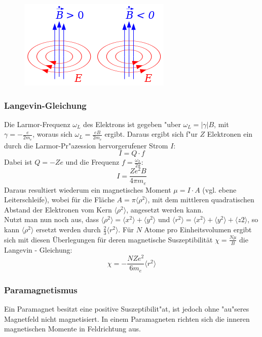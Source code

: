             \begin{figure}[H]
                \centering
                \includegraphics{Images/lenzRegel.png}
                \label{figLenz}
            \end{figure}
        \subsubsection*{Langevin-Gleichung}
        Die Larmor-Frequenz $\omega_L$ des Elektrons ist gegeben "uber $\omega_L = |\gamma | B$, mit $\gamma = -\frac{e}{2m_e}$, woraus sich $\omega_L = \frac{eB}{2m_e}$ ergibt. Daraus ergibt sich f"ur $Z$ Elektronen ein durch die Larmor-Pr"azession hervorgerufener Strom $I$:
        \begin{equation}
        	I = Q \cdot f
        \end{equation}
        Dabei ist $Q = -Ze$ und die Frequenz $f = \frac{\omega_L}{2\pi}$:
        \begin{equation}
        	I = \frac{Ze^2 B}{4\pi m_e}
        \end{equation}
Daraus resultiert wiederum ein magnetisches Moment $\mu = I \cdot A$ (vgl. ebene Leiterschleife), wobei für die Fläche $A = \pi \langle \rho^2 \rangle$, mit dem mittleren quadratischen Abstand der Elektronen vom Kern $\langle \rho^2 \rangle$, angesetzt werden kann.\\
Nutzt man nun noch aus, dass $\langle \rho^2 \rangle = \langle x^2 \rangle + \langle y^2 \rangle$ und $\langle r^2 \rangle = \langle x^2 \rangle + \langle y^2 \rangle + \langle z2 \rangle$, so kann $\langle \rho^2 \rangle$ ersetzt werden durch $\frac{2}{3} \langle r^2 \rangle$. Für $N$ Atome pro Einheitsvolumen ergibt sich mit diesen Überlegungen für deren magnetische Suszeptibilität $\chi = \frac{N\mu}{B}$ die Langevin - Gleichung:
	\begin{equation}
		\chi = - \frac{NZe^2}{6m_e} \langle r^2 \rangle
	\end{equation}
        \subsubsection*{Paramagnetismus}
            Ein Paramagnet besitzt eine positive Suszeptibilit"at, ist jedoch ohne "au"seres
            Magnetfeld nicht magnetisiert. In einem Paramagneten richten sich die inneren magnetischen Momente
            in Feldrichtung aus.
